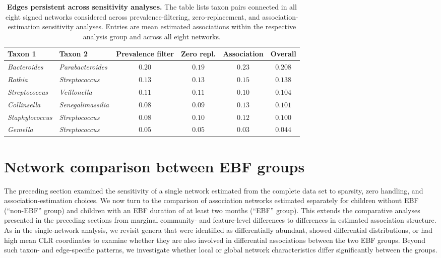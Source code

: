 \begin{table}[!htb]
	\centering
	\caption{\textbf{Edges persistent across sensitivity analyses.} The table lists taxon pairs connected in all eight signed networks considered across prevalence-filtering, zero-replacement, and association-estimation sensitivity analyses. Entries are mean estimated associations within the respective analysis group and across all eight networks.}
	\label{tab:7app:network:persistent_edges}
	\vspace{0.5em}
	\small
	\begin{tabularx}{\textwidth}{l l c c c c}
		\toprule
		Taxon 1 & Taxon 2 & Prevalence filter & Zero repl. & Association & Overall \\
		\midrule
		\emph{Bacteroides} & \emph{Parabacteroides} & $0.20$ & $0.19$ & $0.23$ & $0.208$ \\
		\emph{Rothia} & \emph{Streptococcus} & $0.13$ & $0.13$ & $0.15$ & $0.138$ \\
		\emph{Streptococcus} & \emph{Veillonella} & $0.11$ & $0.11$ & $0.10$ & $0.104$ \\
		\emph{Collinsella} & \emph{Senegalimassilia} & $0.08$ & $0.09$ & $0.13$ & $0.101$ \\
		\emph{Staphylococcus} & \emph{Streptococcus} & $0.08$ & $0.10$ & $0.12$ & $0.100$ \\
		\emph{Gemella} & \emph{Streptococcus} & $0.05$ & $0.05$ & $0.03$ & $0.044$ \\
		\bottomrule
	\end{tabularx}
\end{table}

\section{Network comparison between EBF groups}
\label{sec:7app:network}

The preceding section examined the sensitivity of a single network estimated from the complete data set to sparsity, zero handling, and association-estimation choices. We now turn to the comparison of association networks estimated separately for children without EBF (``non-EBF'' group) and children with an EBF duration of at least two months (``EBF'' group). This extends the comparative analyses presented in the preceding sections from marginal community- and feature-level differences to differences in estimated association structure. As in the single-network analysis, we revisit genera that were identified as differentially abundant, showed differential distributions, or had high mean CLR coordinates to examine whether they are also involved in differential associations between the two EBF groups. Beyond such taxon- and edge-specific patterns, we investigate whether local or global network characteristics differ significantly between the groups.

